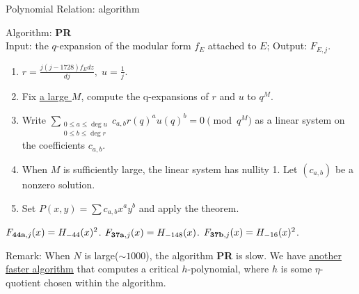 \documentclass[handout]{beamer}
\begin{document}
\begin{frame}{Polynomial Relation: algorithm}

Algorithm: {\bf PR} \\
Input: the $q$-expansion of the modular form $f_E$ attached to $E$; Output: $F_{E,j}$.  

\pause

\begin{enumerate}
\item $r = \frac{j(j-1728) f_E dz }{dj}, \;  u = \frac{1}{j}$.

\pause

\item Fix \hyperlink{largeM}{\underline{a large $M$}}, compute the q-expansions of $r$ and $u$ to $q^M$.  \\

\pause 
\item Write  $\sum_{\substack{0 \leq a \leq \deg u \\ 0 \leq b \leq \deg r}} c_{a,b}r(q)^au(q)^b = 0 \pmod {q^M} $ as a linear system on the coefficients $c_{a,b}$.

\pause 

\item When $M$ is sufficiently large, the linear system has nullity 1. Let $(c_{a,b})$ be a nonzero solution. 

\pause

\item Set $P(x,y) = \sum c_{a,b}x^ay^b$ and apply the theorem.
\end{enumerate}

\hypertarget{pr: algorithm}{}


\pause

\begin{Example}
$F_{{\bf 44a},j}(x) = H_{-44}(x)^2$. $F_{{\bf 37a},j}(x) = H_{-148}(x)$. $F_{{\bf 37b},j}(x) = H_{-16}(x)^2$.
\end{Example}

\pause

Remark: When $N$ is large($\sim 1000$), the algorithm {\bf PR} is slow. We have 
\hyperlink{yang pair}{\underline{another faster algorithm}} that computes a critical $h$-polynomial, where $h$ is some $\eta$-quotient chosen within the algorithm.

\end{frame}


\end{document}
